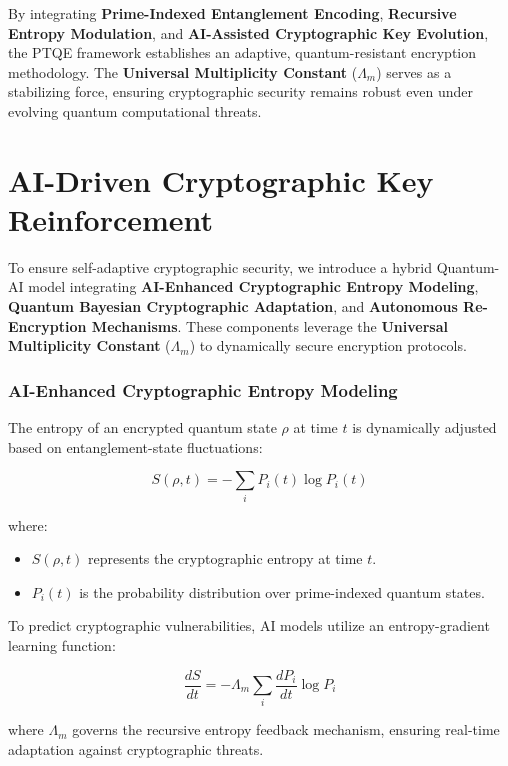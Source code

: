 \documentclass{article}
\theoremstyle{plain}
\begin{document}
By integrating \textbf{Prime-Indexed Entanglement Encoding}, \textbf{Recursive Entropy Modulation}, and \textbf{AI-Assisted Cryptographic Key Evolution}, the PTQE framework establishes an adaptive, quantum-resistant encryption methodology. The \textbf{Universal Multiplicity Constant} ($\Lambda_m$) serves as a stabilizing force, ensuring cryptographic security remains robust even under evolving quantum computational threats.

\section{AI-Driven Cryptographic Key Reinforcement}

To ensure self-adaptive cryptographic security, we introduce a hybrid Quantum-AI model integrating \textbf{AI-Enhanced Cryptographic Entropy Modeling}, \textbf{Quantum Bayesian Cryptographic Adaptation}, and \textbf{Autonomous Re-Encryption Mechanisms}. These components leverage the \textbf{Universal Multiplicity Constant} ($\Lambda_m$) to dynamically secure encryption protocols.

\subsubsection{AI-Enhanced Cryptographic Entropy Modeling}

The entropy of an encrypted quantum state $\rho$ at time $t$ is dynamically adjusted based on entanglement-state fluctuations:

\begin{equation}
    S(\rho, t) = - \sum_i P_i(t) \log P_i(t)
\end{equation}

where:
\begin{itemize}
    \item $S(\rho, t)$ represents the cryptographic entropy at time $t$.
    \item $P_i(t)$ is the probability distribution over prime-indexed quantum states.
\end{itemize}

To predict cryptographic vulnerabilities, AI models utilize an entropy-gradient learning function:

\begin{equation}
    \frac{dS}{dt} = -\Lambda_m \sum_{i} \frac{d P_i}{dt} \log P_i
\end{equation}

where $\Lambda_m$ governs the recursive entropy feedback mechanism, ensuring real-time adaptation against cryptographic threats.
\end{document}
